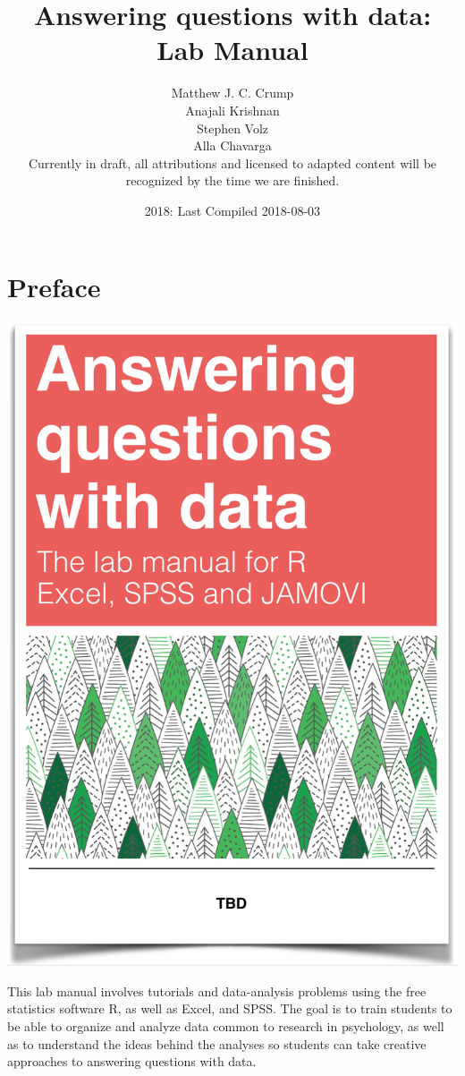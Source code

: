 \documentclass[]{book}
\title{Answering questions with data: Lab Manual}
\author{Matthew J. C. Crump \\ Anajali Krishnan \\ Stephen Volz \\ Alla Chavarga \\ Currently in draft, all attributions and licensed to adapted content
will be recognized by the time we are finished.}
\date{2018: Last Compiled 2018-08-03}
\theoremstyle{definition}
\theoremstyle{definition}
\theoremstyle{definition}
\theoremstyle{remark}
\begin{document}
\maketitle

{
\setcounter{tocdepth}{1}
\tableofcontents
}
\chapter*{Preface}\label{preface}

\begin{center}\includegraphics[width=12.5in]{LabmanualCover} \end{center}

This lab manual involves tutorials and data-analysis problems using the
free statistics software R, as well as Excel, and SPSS. The goal is to
train students to be able to organize and analyze data common to
research in psychology, as well as to understand the ideas behind the
analyses so students can take creative approaches to answering questions
with data.
\end{document}
